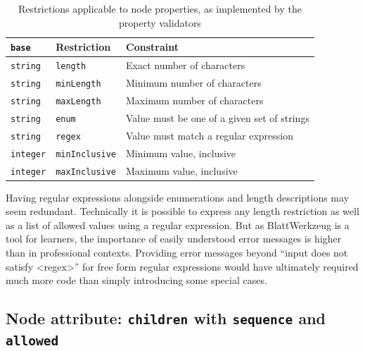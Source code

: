 \documentclass[]{report}
\begin{document}
\begin{table}[ht]
\centering
\begin{tabular}{lll}
\hline
\texttt{base} & Restriction & Constraint \\ \hline
\texttt{string} & \texttt{length} & Exact number of characters \\
\texttt{string} & \texttt{minLength} & Minimum number of characters \\
\texttt{string} & \texttt{maxLength} & Maximum number of characters \\
\texttt{string} & \texttt{enum} & Value must be one of a given set of strings \\
\texttt{string} & \texttt{regex} & Value must match a regular expression \\
\texttt{integer} & \texttt{minInclusive} & Minimum value, inclusive \\
\texttt{integer} & \texttt{maxInclusive} & Maximum value, inclusive \\
\hline
\end{tabular}
\caption{Restrictions applicable to node properties, as implemented by the property validators}
\label{tab:grammar-property-restrictions}
\end{table}

Having regular expressions alongside enumerations and length descriptions may seem redundant. Technically it is possible to express any length restriction as well as a list of allowed values using a regular expression. But as Blatt\-Werkzeug is a tool for learners, the importance of easily understood error messages is higher than in professional contexts. Providing error messages beyond \enquote{input does not satisfy <regex>} for free form regular expressions would have ultimately required much more code than simply introducing some special cases.

\subsection{Node attribute: \texttt{children} with \texttt{sequence} and \texttt{allowed}}
\label{sec:attribute-children}
\end{document}

